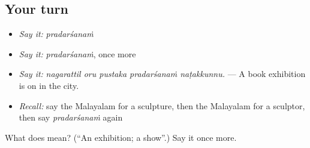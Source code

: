 \subsection*{Your turn}
\begin{itemize}
\raggedright
  \item \emph{Say it:} \emph{pradarśanaṁ}
  \item \emph{Say it:} \emph{pradarśanaṁ}, once more
  \item \emph{Say it:} \emph{nagarattil oru pustaka pradarśanaṁ naṭakkunnu.} — A book exhibition is on in the city.
  \item \emph{Recall:} say the Malayalam for a sculpture, then the Malayalam for a sculptor, then say \emph{pradarśanaṁ} again
\end{itemize}

\begin{tcolorbox}[breakable,colback=teal!4,colframe=teal!35!black,title={Before you move on}]
What does  mean? (\textquotedblleft{}An exhibition; a show\textquotedblright{}.) Say it once more.
\end{tcolorbox}

